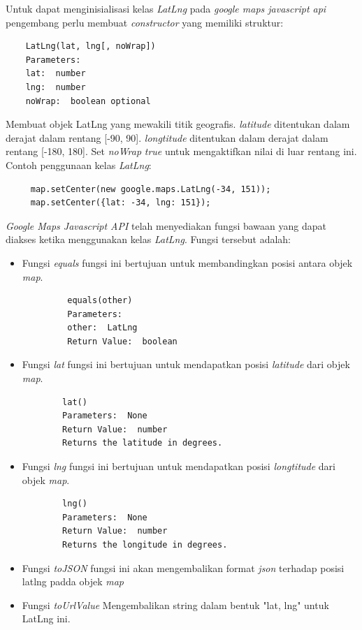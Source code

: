 Untuk dapat menginisialisasi kelas \textit{LatLng} pada \textit{google maps javascript api} pengembang perlu membuat \textit{constructor} yang memiliki struktur:
\begin{lstlisting}
    LatLng(lat, lng[, noWrap])
    Parameters: 
    lat:  number
    lng:  number
    noWrap:  boolean optional
\end{lstlisting}
Membuat objek LatLng yang mewakili titik geografis. \textit{latitude} ditentukan dalam derajat dalam rentang [-90, 90]. \textit{longtitude} ditentukan dalam derajat dalam rentang [-180, 180]. Set \textit{noWrap} \textit{true}  untuk mengaktifkan nilai di luar rentang ini. Contoh penggunaan kelas \textit{LatLng}:
\begin{lstlisting}
     map.setCenter(new google.maps.LatLng(-34, 151));
     map.setCenter({lat: -34, lng: 151}); 
\end{lstlisting}
\textit{Google Maps Javascript API} telah menyediakan fungsi bawaan yang dapat diakses ketika menggunakan kelas \textit{LatLng}. Fungsi tersebut adalah:
\begin{itemize}
    \item Fungsi \textit{equals} fungsi ini bertujuan untuk membandingkan posisi antara objek \textit{map}.
    \begin{lstlisting}
         equals(other)
         Parameters: 
         other:  LatLng
         Return Value:  boolean
    \end{lstlisting}
    \item Fungsi \textit{lat} fungsi ini bertujuan untuk mendapatkan posisi \textit{latitude} dari  objek \textit{map}.
    \begin{lstlisting}
        lat()
        Parameters:  None
        Return Value:  number
        Returns the latitude in degrees.
    \end{lstlisting}
    \item Fungsi \textit{lng} fungsi ini bertujuan untuk mendapatkan posisi \textit{longtitude} dari  objek \textit{map}.
    \begin{lstlisting}
        lng()
        Parameters:  None
        Return Value:  number
        Returns the longitude in degrees.
    \end{lstlisting}
    \item Fungsi \textit{toJSON} fungsi ini akan mengembalikan format \textit{json} terhadap posisi latlng padda objek \textit{map}
    \item Fungsi \textit{toUrlValue} Mengembalikan string dalam bentuk "lat, lng" untuk LatLng ini.
\end{itemize}
